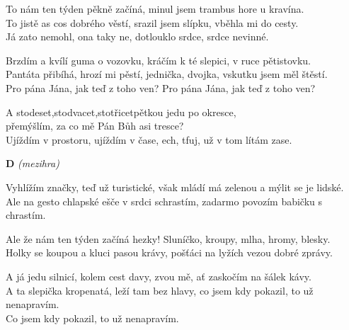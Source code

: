 
\nv{}To nám ten týden pěkně začíná, minul jsem trambus hore u kravína.\\
To jistě as cos dobrého věstí, srazil jsem slípku, vběhla mi do cesty.\\
Já zato nemohl, ona taky ne, dotlouklo srdce, srdce nevinné.
\vnv

\nv Brzdím a kvílí guma o vozovku, kráčím k té slepici, v ruce pětistovku.\\
Pantáta přibíhá, hrozí mi pěstí, jednička, dvojka, vskutku jsem měl štěstí.\\
Pro pána Jána, jak teď z toho ven? Pro pána Jána, jak teď z toho ven?
\vnv

\nv A stodeset,\sm stodvacet,\nc{}stotřicetpětkou jedu po okresce,\\
přemýšlím, za co mě Pán Bůh asi tresce? \nc{}\\
Ujíždím v prostoru, ujíždím v čase, ech, tfuj, už v tom lítám zase.
\vspace{5mm}

\nv\textbf{D} \emph{(mezihra)}
\vspace{5mm}

\nv{}Vyhlížím značky, teď už turistické, však mládí má zelenou a mýlit se je lidské.\\
Ale na gesto chlapské ešče v srdci schrastím, zadarmo povozím babičku s chrastím.
\vnv

\nv Ale že nám ten týden začíná hezky! Sluníčko, kroupy, mlha, hromy, blesky.\\
Holky se koupou a kluci pasou krávy, pošťáci na lyžích vezou dobré zprávy.
\vnv

\nv A já jedu silnicí, kolem cest davy, zvou mě, ať zaskočím na šálek kávy.\\
A ta slepička kropenatá, leží tam bez hlavy, co jsem kdy pokazil, to už nenapravím.\\
Co jsem kdy pokazil, to už nenapravím.
\newpage
